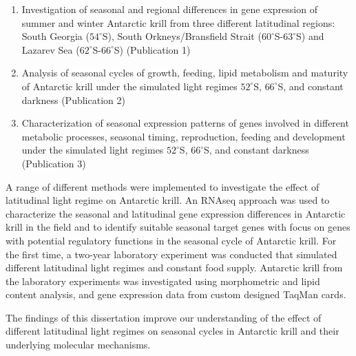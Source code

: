 \begin{enumerate}
\item Investigation of seasonal and regional differences in gene expression of
        summer and winter Antarctic krill from three different latitudinal
                regions: South Georgia ($54^{\circ}$S), South
                Orkneys/Bransfield Strait ($60^{\circ}$S-$63^{\circ}$S) and
                Lazarev Sea ($62^{\circ}$S-$66^{\circ}$S) (Publication 1)
\item Analysis of seasonal cycles of growth, feeding, lipid metabolism and
        maturity of Antarctic krill under the simulated light regimes
                $52^{\circ}$S, $66^{\circ}$S, and constant darkness
                (Publication 2)
\item Characterization of seasonal expression patterns of genes involved in
        different metabolic processes, seasonal timing, reproduction, feeding
                and development under the simulated light regimes
                $52^{\circ}$S, $66^{\circ}$S, and constant darkness
                (Publication 3)
\end{enumerate}

A range of different methods were implemented to investigate the effect of
latitudinal light regime on Antarctic krill. An RNAseq approach was used to
characterize the seasonal and latitudinal gene expression differences in
Antarctic krill in the field and to identify suitable seasonal target genes
with focus on genes with potential regulatory functions in the seasonal cycle
of Antarctic krill. For the first time, a two-year laboratory experiment was
conducted that simulated different latitudinal light regimes and constant food
supply. Antarctic krill from the laboratory experiments was investigated using
morphometric and lipid content analysis, and gene expression data from custom
designed TaqMan cards.

The findings of this dissertation improve our understanding of the effect of
different latitudinal light regimes on seasonal cycles in Antarctic krill and
their underlying molecular mechanisms.

